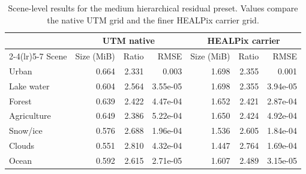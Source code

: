 \begin{table}[t]
\centering
\caption{Scene-level results for the medium hierarchical residual preset. Values compare the native UTM grid and the finer HEALPix carrier grid.}
\label{tab:medium_landcover}
\begin{tabular}{@{}lrrrrrr@{}}
\toprule
& \multicolumn{3}{c}{UTM native} & \multicolumn{3}{c}{HEALPix carrier} \\
\cmidrule(lr){2-4}\cmidrule(lr){5-7}
Scene & Size (MiB) & Ratio & RMSE & Size (MiB) & Ratio & RMSE \\
\midrule
Urban & 0.664 & 2.331 & 0.003 & 1.698 & 2.355 & 0.001 \\
Lake water & 0.604 & 2.564 & 3.55e-05 & 1.698 & 2.355 & 3.94e-05 \\
Forest & 0.639 & 2.422 & 4.47e-04 & 1.652 & 2.421 & 2.87e-04 \\
Agriculture & 0.649 & 2.386 & 5.22e-04 & 1.650 & 2.424 & 4.92e-04 \\
Snow/ice & 0.576 & 2.688 & 1.96e-04 & 1.536 & 2.605 & 1.84e-04 \\
Clouds & 0.551 & 2.810 & 4.32e-04 & 1.447 & 2.764 & 1.69e-04 \\
Ocean & 0.592 & 2.615 & 2.71e-05 & 1.607 & 2.489 & 3.15e-05 \\
\bottomrule
\end{tabular}
\end{table}
